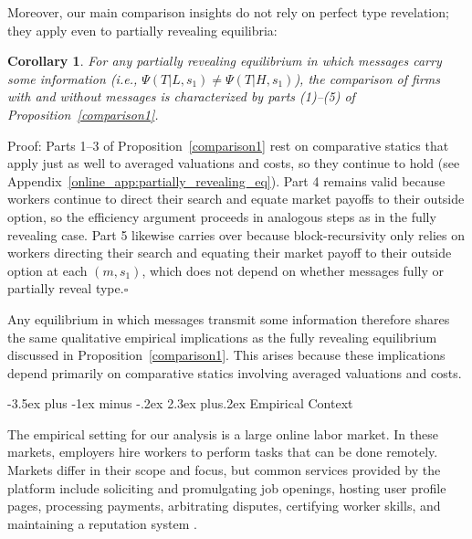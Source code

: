 \documentclass[12pt]{article}
\makeatletter
\renewcommand{\section}{%
  \@startsection{section}{1}{\z@}%
  {-3.5ex plus -1ex minus -.2ex}%
  {2.3ex plus.2ex}%
  {\normalfont\Large\bfseries}%
}
\newtheorem{corollary}[theorem]{Corollary}
\makeatother
\begin{document}
Moreover, our main comparison insights do not rely on perfect type revelation; they apply even to partially revealing equilibria:

\begin{corollary}
\label{cor:partially_revealing}For any partially revealing equilibrium in which messages carry some information (i.e., $\Psi(T|L,s_{1}) \neq \Psi(T|H,s_{1})$), the comparison of firms with and without messages is characterized by parts (1)--(5) of Proposition~\ref{comparison1}.
\end{corollary}

\noindent Proof: Parts 1--3 of Proposition~\ref{comparison1} rest on comparative statics that apply just as well to averaged valuations and costs, so they continue to hold (see Appendix~\ref{online_app:partially_revealing_eq}). Part 4 remains valid because workers continue to direct their search and equate market payoffs to their outside option, so the efficiency argument proceeds in analogous steps as in the fully revealing case. Part 5 likewise carries over because block-recursivity only relies on workers directing their search and equating their market payoff to their outside option at each $(m,s_{1})$, which does not depend on whether messages fully or partially reveal type.$\square$\bigskip

Any equilibrium in which messages transmit some information therefore shares the same qualitative empirical implications as the fully revealing equilibrium discussed in Proposition~\ref{comparison1}. This arises because these implications depend primarily on comparative statics involving averaged valuations and costs.


\section{Empirical Context} \label{sec:empirical_context}

The empirical setting for our analysis is a large online labor market.
In these markets, employers hire workers to perform tasks that can be done remotely.
Markets differ in their scope and focus, but common services provided by the platform include soliciting and promulgating job openings, hosting user profile pages, processing payments, arbitrating disputes, certifying worker skills, and maintaining a reputation system \citep{Horton2010, horton2015reputation}.
\end{document}

